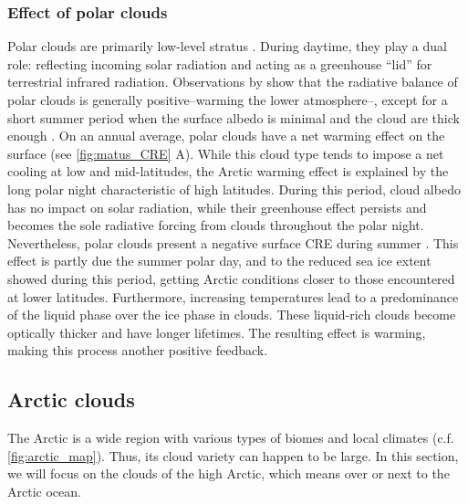     \subsubsection{Effect of polar clouds}
    Polar clouds are primarily low-level stratus \citep{shupe_clouds_2011}. During daytime, they play a dual role: reflecting incoming solar radiation and acting as a greenhouse “lid” for terrestrial infrared radiation. Observations by \citet{intrieri_annual_2002} show that the radiative balance of polar clouds is generally positive\---warming the lower atmosphere\---, except for a short summer period when the surface albedo is minimal and the cloud are thick enough \citep{maillard_characterisation_2021}. On an annual average, polar clouds have a net warming effect on the surface (see \cref{fig:matus_CRE} A).
    While this cloud type tends to impose a net cooling at low and mid-latitudes, the Arctic warming effect is explained by the long polar night characteristic of high latitudes. During this period, cloud albedo has no impact on solar radiation, while their greenhouse effect persists and becomes the sole radiative forcing from clouds throughout the polar night.
    Nevertheless, polar clouds present a negative surface CRE during summer \citep{matus_role_2017}. This effect is partly due the summer polar day, and to the reduced sea ice extent showed during this period, getting Arctic conditions closer to those encountered at lower latitudes.
    Furthermore, increasing temperatures lead to a predominance of the liquid phase over the ice phase in clouds. These liquid-rich clouds become optically thicker and have longer lifetimes. The resulting effect is warming, making this process another positive feedback.

    

    \subsection{Arctic clouds}
    \label{sec:arctic_clouds}
    
    The Arctic is a wide region with various types of biomes and local climates (c.f. \cref{fig:arctic_map}). Thus, its cloud variety can happen to be large.
    In this section, we will focus on the clouds of the high Arctic, which means over or next to the Arctic ocean.

